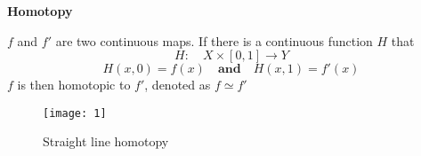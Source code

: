 \documentclass[aspectratio=169]{beamer}
\begin{document}
\begin{frame}{\textbf{Homotopy}}
    \begin{bee}[Definition]
        $f$ and $f'$ are two continuous maps. If there is a continuous function $H$ that 
        $$H: \quad X \times [0,1] \rightarrow Y$$
        $$H(x,0)=f(x) \quad \textbf{and} \quad H(x,1)=f'(x)$$
        $f$ is then homotopic to $f'$, denoted as $f \simeq f'$
    \end{bee} 
\begin{figure}
    \centering
    \texttt{[image: 1]}
    \caption{Straight line homotopy}
    \label{fig:my_label}
\end{figure}
\end{frame}
\end{document}
